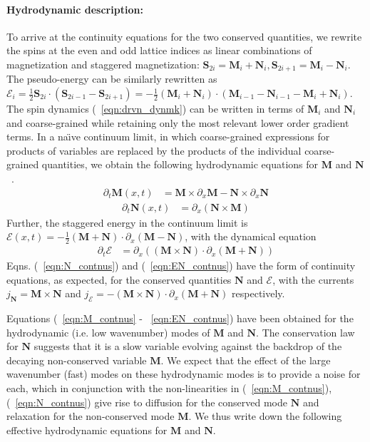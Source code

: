 \documentclass[prl,aps,twocolumn,nosuperscriptaddress,bibnotes,notitlepage,nofootinbib]{revtex4-2}
\newcommand{\magg}{\mathbf{M}}
\newcommand{\stagg}{\mathbf{N}}
\newcommand{\spin}{\mathbf{S}}
\begin{document}
\paragraph{Hydrodynamic description:}To arrive at the continuity equations for the two conserved quantities, we rewrite the spins at the even and odd lattice indices as linear combinations of magnetization and staggered magnetization: 
$ \spin_{2i}  = \magg_i + \stagg_i ,  \spin_{2i+1} = \magg_i - \stagg_i$. 
The pseudo-energy can be similarly rewritten as 
${\mathcal{E}}_i = \frac{1}{2}\spin_{2i} \cdot (\spin_{2i-1} - \spin_{2i+1})
     = -\frac{1}{2}(\magg_i+\stagg_i)\cdot (\magg_{i-1} -  \stagg_{i-1} - \magg_i + \stagg_i) $.
The spin dynamics (~\ref{eqn:drvn_dynmk}) can be written in terms of $\magg_{i}$ and $\stagg_{i}$ and coarse-grained while retaining only the most relevant lower order gradient terms. In a na\"{\i}ve continuum limit, in which coarse-grained expressions for products of variables are replaced by the products of the individual coarse-grained quantities, we obtain the following hydrodynamic equations for $\magg$ and $\stagg$~\cite{Suppinf}.
\begin{align}
    \partial_t \magg(x,t) &=  \magg \times \partial_x \magg  - \stagg \times \partial_x \stagg
    \label{eqn:M_contnus}
\end{align}
\begin{align}
    \partial_t \stagg(x,t) &= \partial_x (\stagg \times \magg )
    \label{eqn:N_contnus}
\end{align}
Further, the staggered energy in the continuum limit is
${\mathcal{E}}(x,t)   =  -\frac{1}{2} (\magg + \stagg) \cdot \partial_x (\magg - \stagg) $, with the dynamical equation~\cite{Suppinf}
 \begin{align}
    \partial_t {\mathcal{E}} &= \partial_x \left( (\magg \times \stagg) \cdot \partial_x (\magg + \stagg) \right)
    \label{eqn:EN_contnus}
\end{align}
Eqns. (~\ref{eqn:N_contnus}) and (~\ref{eqn:EN_contnus}) have the form of continuity equations, as expected, for the conserved quantities $\stagg$ and ${\mathcal{E}}$, with the currents $j_{\stagg} = \magg \times \stagg $ and $j_{{\mathcal{E}}} =  -(\magg \times \stagg) \cdot \partial_x (\magg + \stagg)$ respectively. 

Equations (~\ref{eqn:M_contnus} - ~\ref{eqn:EN_contnus}) have been obtained for the hydrodynamic (i.e. low wavenumber) modes of $\magg$ and $\stagg$. The conservation law for $\stagg$ suggests that it is a slow variable evolving against the backdrop of the decaying non-conserved variable $\magg$. We expect that the effect of the large wavenumber (fast) modes on these hydrodynamic modes is to provide a noise for each, which in conjunction with the non-linearities in (~\ref{eqn:M_contnus}),(~\ref{eqn:N_contnus}) give rise to diffusion for the conserved mode $\stagg$ and relaxation for the non-conserved mode $\magg$.
We thus write down the following effective hydrodynamic equations for $\magg$ and $\stagg$.
\end{document}
